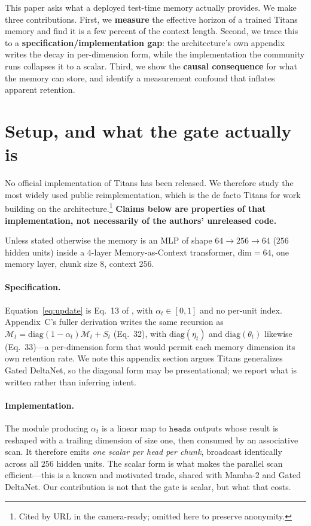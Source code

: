 \documentclass{article}
\begin{document}
This paper asks what a deployed test-time memory actually provides. We make
three contributions. First, we \textbf{measure} the effective horizon of a
trained Titans memory and find it is a few percent of the context length.
Second, we trace this to a \textbf{specification/implementation gap}: the
architecture's own appendix writes the decay in per-dimension form, while the
implementation the community runs collapses it to a scalar. Third, we show the
\textbf{causal consequence} for what the memory can store, and identify a
measurement confound that inflates apparent retention.

\section{Setup, and what the gate actually is}

No official implementation of Titans has been released. We therefore study the
most widely used public reimplementation, which is the de facto Titans for work
building on the architecture.\footnote{Cited by URL in the camera-ready;
omitted here to preserve anonymity.} \textbf{Claims below are properties of that
implementation, not necessarily of the authors' unreleased code.}

Unless stated otherwise the memory is an MLP of shape $64\to256\to64$ ($256$
hidden units) inside a 4-layer Memory-as-Context transformer, $\mathrm{dim}=64$,
one memory layer, chunk size $8$, context $256$.

\paragraph{Specification.} Equation~\ref{eq:update} is Eq.~13 of
\citet{behrouz2025titans}, with $\alpha_t\in[0,1]$ and no per-unit index.
Appendix~C's fuller derivation writes the same recursion as
$\mathcal{M}_t = \mathrm{diag}(1-\alpha_t)\mathcal{M}_t + S_t$ (Eq.~32), with
$\mathrm{diag}(\eta_t)$ and $\mathrm{diag}(\theta_t)$ likewise (Eq.~33)---a
per-dimension form that would permit each memory dimension its own retention
rate. We note this appendix section argues Titans generalizes Gated DeltaNet,
so the diagonal form may be presentational; we report what is written rather
than inferring intent.

\paragraph{Implementation.} The module producing $\alpha_t$ is a linear map to
$\texttt{heads}$ outputs whose result is reshaped with a trailing dimension of
size one, then consumed by an associative scan. It therefore emits \emph{one
scalar per head per chunk}, broadcast identically across all $256$ hidden units.
The scalar form is what makes the parallel scan efficient---this is a known and
motivated trade, shared with Mamba-2 and Gated DeltaNet. Our contribution is not
that the gate is scalar, but what that costs.
\end{document}
